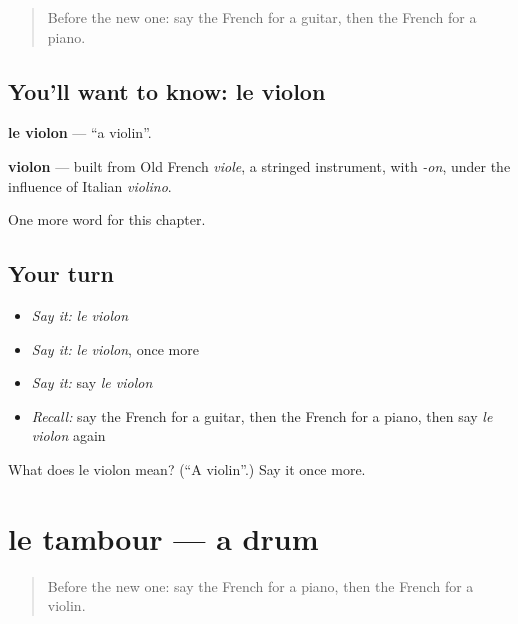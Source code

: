 \label{lesson:FR-C256-violon}



\begin{quote}
Before the new one: say the French for a guitar, then the French for a piano.
\end{quote}

\subsection*{You'll want to know: le violon}
\textbf{le violon} — \textquotedblleft{}a violin\textquotedblright{}.

\begin{cousinweb}
\textbf{violon} — built from Old French \emph{viole}, a stringed instrument, with \emph{-on}, under the influence of Italian \emph{violino}.
\end{cousinweb}

\begin{grammarlens}[title={What you've built}]
One more word for this chapter.
\end{grammarlens}

\subsection*{Your turn}
\begin{itemize}
\raggedright
  \item \emph{Say it:} \emph{le violon}
  \item \emph{Say it:} \emph{le violon}, once more
  \item \emph{Say it:} say \emph{le violon}
  \item \emph{Recall:} say the French for a guitar, then the French for a piano, then say \emph{le violon} again
\end{itemize}

\begin{tcolorbox}[breakable,colback=teal!4,colframe=teal!35!black,title={Before you move on}]
What does le violon mean? (\textquotedblleft{}A violin\textquotedblright{}.) Say it once more.
\end{tcolorbox}
\section[le tambour]{le tambour — a drum}

\label{lesson:FR-C256-tambour}



\begin{quote}
Before the new one: say the French for a piano, then the French for a violin.
\end{quote}

